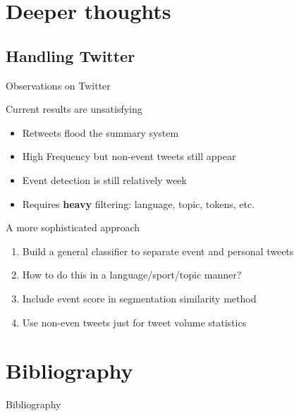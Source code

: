 \documentclass[compress]{beamer}
\begin{document}
\section{Deeper thoughts}

\subsection{Handling Twitter}

\begin{frame}{Observations on Twitter}

\begin{block}{Current results are unsatisfying}
\begin{itemize}
\item Retweets flood the summary system
\item High Frequency but non-event tweets still appear
\item Event detection is still relatively week
\item Requires \textbf{heavy} filtering: language, topic, tokens, etc.
\end{itemize}
\end{block}

\pause

\begin{block}{A more sophisticated approach}
\begin{enumerate}
\item Build a general classifier to separate event and personal tweets
\item How to do this in a language/sport/topic manner?
\item Include event score in segmentation similarity method
\item Use non-even tweets just for tweet volume statistics
\end{enumerate}
\end{block}
\end{frame}

\section{Bibliography}

\begin{frame}{Bibliography}
\tiny


\end{frame}
\end{document}
